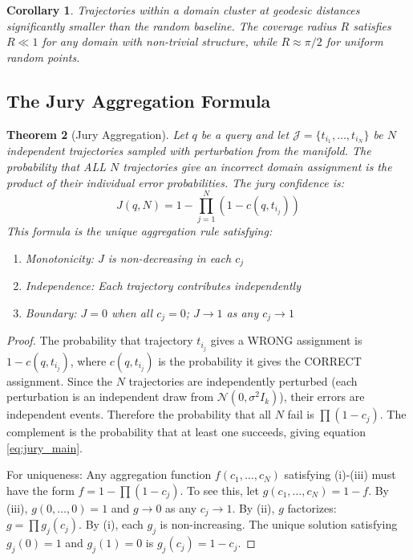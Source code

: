 \documentclass[11pt]{article}
\newtheorem{theorem}{Theorem}[section]
\newtheorem{corollary}[theorem]{Corollary}
\begin{document}
\begin{corollary}
Trajectories within a domain cluster at geodesic distances significantly smaller than the random baseline. The coverage radius $R$ satisfies $R \ll 1$ for any domain with non-trivial structure, while $R \approx \pi/2$ for uniform random points.
\end{corollary}

\subsection{The Jury Aggregation Formula}

\begin{theorem}[Jury Aggregation]\label{thm:jury}
Let $q$ be a query and let $\mathcal{J} = \{t_{i_1}, \ldots, t_{i_N}\}$ be $N$ independent trajectories sampled with perturbation from the manifold. The probability that ALL $N$ trajectories give an incorrect domain assignment is the product of their individual error probabilities. The jury confidence is:
\begin{equation}\label{eq:jury_main}
J(q, N) = 1 - \prod_{j=1}^{N} (1 - c(q, t_{i_j}))
\end{equation}
This formula is the unique aggregation rule satisfying:
\begin{enumerate}[nosep,label=(\roman*)]
\item Monotonicity: $J$ is non-decreasing in each $c_j$
\item Independence: Each trajectory contributes independently
\item Boundary: $J = 0$ when all $c_j = 0$; $J \to 1$ as any $c_j \to 1$
\end{enumerate}
\end{theorem}
\begin{proof}
The probability that trajectory $t_{i_j}$ gives a WRONG assignment is $1 - c(q, t_{i_j})$, where $c(q, t_{i_j})$ is the probability it gives the CORRECT assignment. Since the $N$ trajectories are independently perturbed (each perturbation is an independent draw from $\mathcal{N}(0, \sigma^2 I_k)$), their errors are independent events. Therefore the probability that all $N$ fail is $\prod(1-c_j)$. The complement is the probability that at least one succeeds, giving equation \ref{eq:jury_main}.

For uniqueness: Any aggregation function $f(c_1,\ldots,c_N)$ satisfying (i)-(iii) must have the form $f = 1 - \prod(1-c_j)$. To see this, let $g(c_1,\ldots,c_N) = 1 - f$. By (iii), $g(0,\ldots,0) = 1$ and $g \to 0$ as any $c_j \to 1$. By (ii), $g$ factorizes: $g = \prod g_j(c_j)$. By (i), each $g_j$ is non-increasing. The unique solution satisfying $g_j(0)=1$ and $g_j(1)=0$ is $g_j(c_j) = 1-c_j$.
\end{proof}
\end{document}

